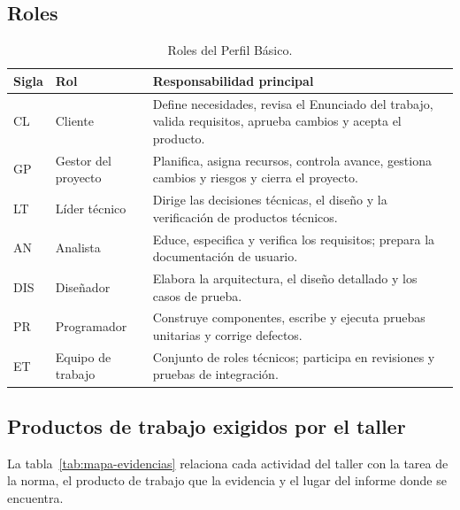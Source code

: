 \documentclass[11pt,a4paper]{article}
\begin{document}
\subsection{Roles}
\begin{table}[H]
\centering\small
\caption{Roles del Perfil Básico.}
\label{tab:roles-norma}
\begin{tabularx}{\linewidth}{@{}l l L@{}}
\toprule
\textbf{Sigla} & \textbf{Rol} & \textbf{Responsabilidad principal} \\
\midrule
CL  & Cliente            & Define necesidades, revisa el Enunciado del trabajo, valida requisitos, aprueba cambios y acepta el producto. \\
GP  & Gestor del proyecto & Planifica, asigna recursos, controla avance, gestiona cambios y riesgos y cierra el proyecto. \\
LT  & Líder técnico       & Dirige las decisiones técnicas, el diseño y la verificación de productos técnicos. \\
AN  & Analista            & Educe, especifica y verifica los requisitos; prepara la documentación de usuario. \\
DIS & Diseñador           & Elabora la arquitectura, el diseño detallado y los casos de prueba. \\
PR  & Programador         & Construye componentes, escribe y ejecuta pruebas unitarias y corrige defectos. \\
ET  & Equipo de trabajo   & Conjunto de roles técnicos; participa en revisiones y pruebas de integración. \\
\bottomrule
\end{tabularx}
\end{table}

\subsection{Productos de trabajo exigidos por el taller}
La tabla~\ref{tab:mapa-evidencias} relaciona cada actividad del taller con la tarea de la norma, el producto de trabajo que la evidencia y el lugar del informe donde se encuentra.
\end{document}
